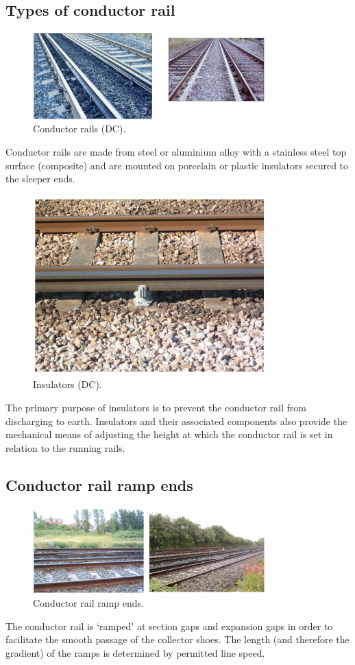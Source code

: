 \subsection{Types of conductor rail}
\begin{figure}[H]
    \centering
    \includegraphics[width = 0.8\textwidth]{img/figure122.png}
    \caption{Conductor rails (DC).}
\end{figure}
Conductor rails are made from steel or aluminium alloy with a stainless steel top surface (composite) and are mounted on porcelain or plastic insulators secured to the sleeper ends.
\begin{figure}[H]
    \centering
    \includegraphics[width = 0.8\textwidth]{img/figure123.png}
    \caption{Insulators (DC).}
\end{figure}
The primary purpose of insulators is to prevent the conductor rail from discharging to earth. Insulators and their associated components also provide the mechanical means of adjusting the height at which the conductor rail is set in relation to the running rails.
\subsection{Conductor rail ramp ends}
\begin{figure}[H]
    \centering
    \includegraphics[width = 0.8\textwidth]{img/figure124.png}
    \caption{Conductor rail ramp ends.}
\end{figure}
The conductor rail is `ramped' at section gaps and expansion gaps in order to facilitate the smooth passage of the collector shoes. The length (and therefore the gradient) of the ramps is determined by permitted line speed.
